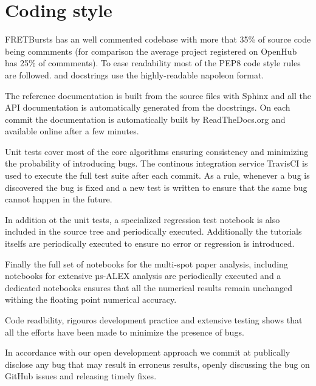 \section{Coding style}

FRETBursts has an well commented codebase with more that 35\% of source code
being commments (for comparison the average project registered on OpenHub has 25\%
of commments). To ease readability most of the PEP8 code style rules are followed.
and docstrings use the highly-readable napoleon format.

The reference documentation is built from the source files with Sphinx and
all the API documentation is automatically generated from the docstrings.
On each commit the documentation is automatically built by ReadTheDocs.org
and available online after a few minutes.

Unit tests cover most of the core algorithms ensuring consistency and 
minimizing the probability of introducing bugs. The continous integration
service TravisCI is used to execute the full test suite after each commit.
As a rule, whenever a bug is discovered the bug is fixed and a new test is 
written to ensure that the same bug cannot happen in the future.

In addition ot the unit tests, a specialized regression test notebook is
also included in the source tree and periodically executed. Additionally
the tutorials itselfs are periodically executed to ensure no error or 
regression is introduced.

Finally the full set of notebooks for the multi-spot paper analysis,
including notebooks for extensive µs-ALEX analysis are periodically
executed and a dedicated notebooks ensures that all the numerical
results remain unchanged withing the floating point numerical accuracy.

Code readbility, rigouros development practice and extensive testing
shows that all the efforts have been made to minimize the presence 
of bugs.

In accordance with our open development approach we commit at publically
disclose any bug that may result in erroneus results, openly discussing
the bug on GitHub issues and releasing timely fixes.

